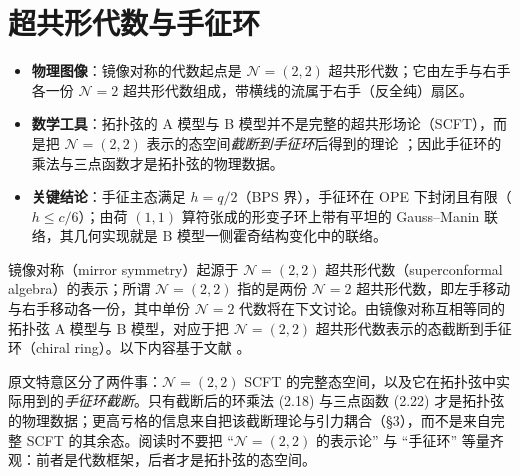
\section{超共形代数与手征环}
\label{sec:2}

\begin{keytakeaways}
  \begin{itemize}[leftmargin=1.4em,itemsep=2pt,topsep=2pt]
    \item \textbf{物理图像}：镜像对称的代数起点是 $\mathcal{N}=(2,2)$ 超共形代数；它由左手与右手各一份 $\mathcal{N}=2$ 超共形代数组成，带横线的流属于右手（反全纯）扇区。
    \item \textbf{数学工具}：拓扑弦的 A 模型与 B 模型并不是完整的超共形场论（SCFT），而是把 $\mathcal{N}=(2,2)$ 表示的态空间\emph{截断到手征环}后得到的理论 \cite{ref5}；因此手征环的乘法与三点函数才是拓扑弦的物理数据。
    \item \textbf{关键结论}：手征主态满足 $h=q/2$（BPS 界），手征环在 OPE 下封闭且有限（$h\le c/6$）；由荷 $(1,1)$ 算符张成的形变子环上带有平坦的 Gauss--Manin 联络，其几何实现就是 B 模型一侧霍奇结构变化中的联络。
  \end{itemize}
\end{keytakeaways}

镜像对称（mirror symmetry）起源于 $\mathcal{N}=(2,2)$ 超共形代数（superconformal algebra）的表示；所谓 $\mathcal{N}=(2,2)$ 指的是两份 $\mathcal{N}=2$ 超共形代数，即左手移动与右手移动各一份，其中单份 $\mathcal{N}=2$ 代数将在下文讨论。由镜像对称互相等同的拓扑弦 A 模型与 B 模型，对应于把 $\mathcal{N}=(2,2)$ 超共形代数表示的态截断到手征环（chiral ring）\cite{ref5}。以下内容基于文献 \cite{ref27,ref29,ref6,ref30,ref31,ref10,ref32}。

\begin{yizhu}[物理图像]
原文特意区分了两件事：$\mathcal{N}=(2,2)$ SCFT 的完整态空间，以及它在拓扑弦中实际用到的\emph{手征环截断}。只有截断后的环乘法 (2.18) 与三点函数 (2.22) 才是拓扑弦的物理数据；更高亏格的信息来自把该截断理论与引力耦合（§3），而不是来自完整 SCFT 的其余态。阅读时不要把 “$\mathcal{N}=(2,2)$ 的表示论” 与 “手征环” 等量齐观：前者是代数框架，后者才是拓扑弦的态空间。
\end{yizhu}


